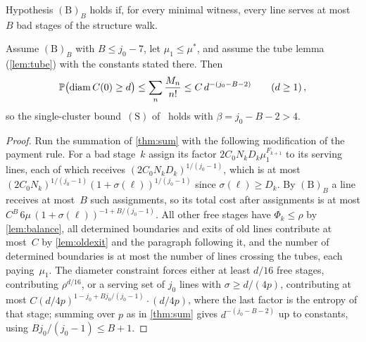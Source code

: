 \documentclass[11pt,letterpaper]{article}
\DeclareMathOperator{\diam}{diam}
\begin{document}
\begin{definition}
\label{def:B}
Hypothesis $\mathrm{(B)}_B$ holds if, for every minimal witness, every line serves at most~$B$ bad stages of the structure walk.
\end{definition}

\begin{theorem}
\label{thm:conditional}
Assume $\mathrm{(B)}_B$ with $B\le j_0-7$, let $\mu_1\le\mu^*$, and assume the tube lemma (\cref{lem:tube}) with the constants stated there. Then
\begin{equation}
\label{eq:condfinal}
  \P\bigl(\diam C(0)\ge d\bigr)\le\sum_n\frac{M_n}{n!}\le C\,d^{-(j_0-B-2)}\qquad(d\ge1)\,,
\end{equation}
so the single-cluster bound~$\mathrm{(S)}$ of~\cite{FM26} holds with $\beta=j_0-B-2>4$.
\end{theorem}

\begin{proof}
Run the summation of \cref{thm:sum} with the following modification of the payment rule. For a bad stage~$k$ assign its factor $2C_0N_kD_k\mu_1^{F_{k+1}}$ to its serving lines, each of which receives $(2C_0N_kD_k)^{1/(j_0-1)}$, which is at most $(2C_0N_k)^{1/(j_0-1)}(1+\sigma(\ell))^{1/(j_0-1)}$ since $\sigma(\ell)\ge D_k$. By $\mathrm{(B)}_B$ a line receives at most~$B$ such assignments, so its total cost after assignments is at most $C^B\,6\mu\,(1+\sigma(\ell))^{-1+B/(j_0-1)}$. All other free stages have $\Phi_k\le\rho$ by \cref{lem:balance}, all determined boundaries and exits of old lines contribute at most~$C$ by \cref{lem:oldexit} and the paragraph following it, and the number of determined boundaries is at most the number of lines crossing the tubes, each paying~$\mu_1$. The diameter constraint forces either at least $d/16$ free stages, contributing $\rho^{d/16}$, or a serving set of $j_0$ lines with $\sigma\ge d/(4p)$, contributing at most $C(d/4p)^{1-j_0+Bj_0/(j_0-1)}\cdot(d/4p)$, where the last factor is the entropy of that stage; summing over $p$ as in \cref{thm:sum} gives $d^{-(j_0-B-2)}$ up to constants, using $Bj_0/(j_0-1)\le B+1$.
\end{proof}
\end{document}
